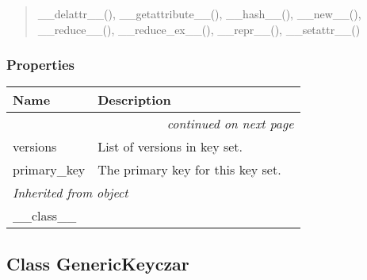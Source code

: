 \begin{quote}
\_\_delattr\_\_(), \_\_getattribute\_\_(), \_\_hash\_\_(), \_\_new\_\_(), \_\_reduce\_\_(), \_\_reduce\_ex\_\_(), \_\_repr\_\_(), \_\_setattr\_\_()
\end{quote}


  \subsubsection{Properties}

    \vspace{-1cm}
\hspace{\varindent}\begin{longtable}{|p{\varnamewidth}|p{\vardescrwidth}|l}
\cline{1-2}
\cline{1-2} \centering \textbf{Name} & \centering \textbf{Description}& \\
\cline{1-2}
\endhead\cline{1-2}\multicolumn{3}{r}{\small\textit{continued on next page}}\\\endfoot\cline{1-2}
\endlastfoot\raggedright v\-e\-r\-s\-i\-o\-n\-s\- & \raggedright List of versions in key set.&\\
\cline{1-2}
\raggedright p\-r\-i\-m\-a\-r\-y\-\_\-k\-e\-y\- & \raggedright The primary key for this key set.&\\
\cline{1-2}
\multicolumn{2}{|l|}{\textit{Inherited from object}}\\
\multicolumn{2}{|p{\varwidth}|}{\raggedright \_\_class\_\_}\\
\cline{1-2}
\end{longtable}



\subsection{Class GenericKeyczar}

